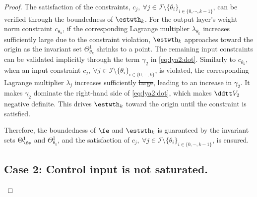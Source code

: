 \documentclass[letterpaper, journal]{IEEEtran}
\providecommand{\DIFadd}[1]{{\protect\color{blue}\uwave{#1}}} %
\providecommand{\DIFdel}[1]{{\protect\color{red}\sout{#1}}} %
\providecommand{\DIFaddbegin}{} %
\providecommand{\DIFaddend}{} %
\providecommand{\DIFdelbegin}{} %
\providecommand{\DIFdelend}{} %
\begin{document}
\begin{proof}
The satisfaction of the constraints, \ie $c_j,\ \forall j\in\mathcal{I}\setminus \{\theta_i\}_{i\in\{0,\cdots,k-1\}}$, can be verified through the boundedness of $\estwth_k$.
For the output layer's weight norm constraint $c_{\theta_k}$, if the corresponding Lagrange multiplier $\lambda_{\theta_k}$ increases sufficiently large due to the constraint violation, $\estwth_k$ approaches toward the origin as the invariant set $\Theta_{\theta_k}^{1}$ shrinks to a point.
The remaining input constraints can be validated implicitly through the term ${\gamma}_2$ in \eqref{eq:lya2:dot}.
Similarly to $c_{\theta_k}$, when an input constraint $c_j,\ \forall j\in\mathcal{I}\setminus \{\theta_i\}_{i\in\{0,\cdots,k\}}$, is violated, the corresponding Lagrange multiplier $\lambda_j$ increases sufficiently \DIFdelbegin \DIFdel{large}\DIFdelend \DIFaddbegin \DIFadd{to a large value}\DIFaddend , leading to an increase in ${\gamma}_2$.
It makes ${\gamma}_2$ dominate the right-hand side of \eqref{eq:lya2:dot}, which makes $\ddtt V_2$ negative definite.
This drives $\estwth_k$ toward the origin until the constraint is satisfied.

Therefore, the boundedness of $\fe$ and $\estwth_k$ is guaranteed by the invariant sets $\Theta_{\fe}^{1}$ and $\Theta_{\theta_k}^{1}$, and the satisfaction of $c_j,\ \forall j\in\mathcal{I}\setminus \{\theta_i\}_{i\in\{0,\cdots,k-1\}}$, is ensured.

\subsection*{Case 2: Control input is not saturated.}


\end{proof}
\end{document}
